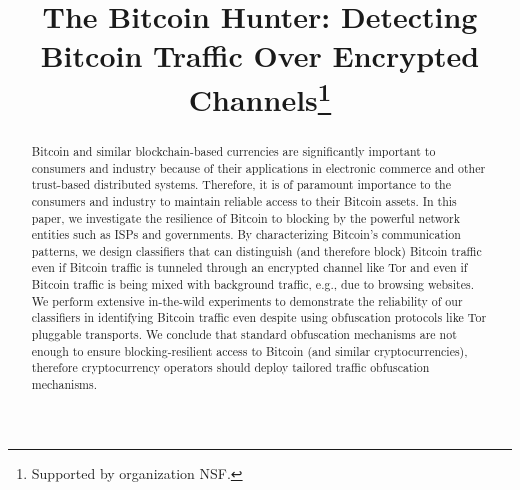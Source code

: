 \documentclass[runningheads]{llncs}
\begin{document}
%
\title{The Bitcoin Hunter:
Detecting Bitcoin Traffic Over Encrypted Channels\thanks{Supported by organization NSF.}}
%
%
%
%
%
\maketitle              %
%
\begin{abstract}

Bitcoin and similar blockchain-based currencies are significantly important to   
 consumers and industry because of their applications in
electronic commerce and other trust-based distributed systems. 
Therefore, it is of paramount importance to the consumers and industry to maintain reliable access to their Bitcoin assets. 
In this paper, we investigate the  resilience of Bitcoin to blocking by the powerful network 
entities such as ISPs and governments.
By characterizing Bitcoin's communication patterns, we design classifiers that can distinguish (and therefore block) Bitcoin traffic even if Bitcoin traffic is tunneled through an encrypted channel like Tor and even if Bitcoin traffic is being mixed with background traffic, e.g., due to browsing websites. 
We perform extensive in-the-wild experiments to demonstrate the reliability of our classifiers in identifying Bitcoin traffic even despite using obfuscation protocols like Tor pluggable transports. 
We conclude that standard obfuscation mechanisms are not enough to ensure 
blocking-resilient access to Bitcoin (and similar cryptocurrencies), therefore
cryptocurrency operators should deploy tailored traffic obfuscation mechanisms.

\end{abstract}













%


\appendix



\end{document}
